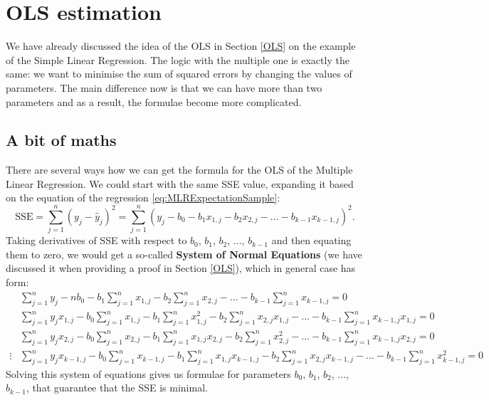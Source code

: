 \documentclass[
]{book}
\theoremstyle{definition}
\theoremstyle{definition}
\theoremstyle{definition}
\theoremstyle{definition}
\theoremstyle{remark}
\begin{document}
\section{OLS estimation}\label{ols-estimation}

We have already discussed the idea of the OLS in Section \ref{OLS} on the example of the Simple Linear Regression. The logic with the multiple one is exactly the same: we want to minimise the sum of squared errors by changing the values of parameters. The main difference now is that we can have more than two parameters and as a result, the formulae become more complicated.

\subsection{A bit of maths}\label{a-bit-of-maths}

There are several ways how we can get the formula for the OLS of the Multiple Linear Regression. We could start with the same SSE value, expanding it based on the equation of the regression \eqref{eq:MLRExpectationSample}:
\begin{equation*}
    \mathrm{SSE} = \sum_{j=1}^n (y_j - \hat{y}_j)^2 = \sum_{j=1}^n (y_j - b_0 - b_1 x_{1,j} - b_2 x_{2,j} - \dots - b_{k-1} x_{k-1,j})^2 .
\end{equation*}
Taking derivatives of SSE with respect to \(b_0\), \(b_1\), \(b_2\), \(\dots\), \(b_{k-1}\) and then equating them to zero, we would get a so-called \textbf{System of Normal Equations} (we have discussed it when providing a proof in Section \ref{OLS}), which in general case has form:
\begin{equation*}
    \begin{aligned}
        & \sum_{j=1}^n y_j - n b_0 - b_1 \sum_{j=1}^n x_{1,j} - b_2 \sum_{j=1}^n x_{2,j} - \dots - b_{k-1} \sum_{j=1}^n x_{k-1,j} = 0 \\
        & \sum_{j=1}^n y_j x_{1,j} - b_0 \sum_{j=1}^n x_{1,j} - b_1 \sum_{j=1}^n x^2_{1,j} - b_2 \sum_{j=1}^n x_{2,j} x_{1,j} - \dots - b_{k-1} \sum_{j=1}^n x_{k-1,j} x_{1,j} = 0 \\
        & \sum_{j=1}^n y_j x_{2,j} - b_0 \sum_{j=1}^n x_{2,j} - b_1 \sum_{j=1}^n x_{1,j} x_{2,j} - b_2 \sum_{j=1}^n x^2_{2,j} - \dots - b_{k-1} \sum_{j=1}^n x_{k-1,j} x_{2,j} = 0 \\
        \vdots
        & \sum_{j=1}^n y_j x_{k-1,j} - b_0 \sum_{j=1}^n x_{k-1,j} - b_1 \sum_{j=1}^n x_{1,j} x_{k-1,j} - b_2 \sum_{j=1}^n x_{2,j} x_{k-1,j} - \dots - b_{k-1} \sum_{j=1}^n x^2_{k-1,j} = 0
    \end{aligned}
\end{equation*}
Solving this system of equations gives us formulae for parameters \(b_0\), \(b_1\), \(b_2\), \(\dots\), \(b_{k-1}\), that guarantee that the SSE is minimal.
\end{document}
